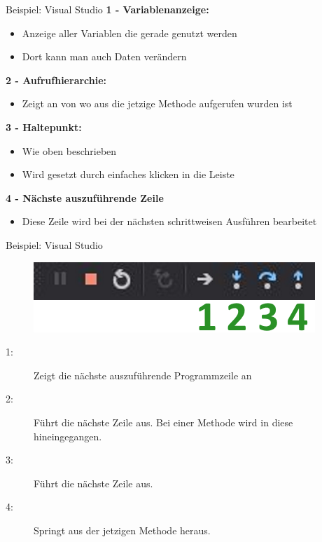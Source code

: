 \begin{frame}{Beispiel: Visual Studio}
	\textbf{1 - Variablenanzeige:}
	\begin{itemize}
		\item Anzeige aller Variablen die gerade genutzt werden
		\item Dort kann man auch Daten verändern
	\end{itemize}
	\textbf{2 - Aufrufhierarchie:}
	\begin{itemize}
		\item Zeigt an von wo aus die jetzige Methode aufgerufen wurden ist
	\end{itemize}
	\textbf{3 - Haltepunkt:}
	\begin{itemize}
		\item Wie oben beschrieben
		\item Wird gesetzt durch einfaches klicken in die Leiste
	\end{itemize}
	\textbf{4 - Nächste auszuführende Zeile}
	\begin{itemize}
		\item Diese Zeile wird bei der nächsten schrittweisen Ausführen bearbeitet
	\end{itemize}
\end{frame}

\begin{frame}{Beispiel: Visual Studio}
	\begin{figure}
		\includegraphics{resources/02_grundlagen_2/debugging.png}
	\end{figure}
	\begin{description}
		\item[1: ] Zeigt die nächste auszuführende Programmzeile an
		\item[2: ] Führt die nächste Zeile aus. Bei einer Methode wird in diese hineingegangen.
		\item[3: ] Führt die nächste Zeile aus.
		\item[4: ] Springt aus der jetzigen Methode heraus.
	\end{description}
\end{frame}


